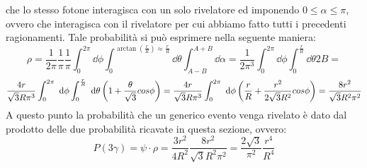   che lo stesso fotone interagisca con un solo rivelatore ed imponendo \(0 \le \alpha \le \pi\), ovvero che interagisca con il rivelatore per cui abbiamo fatto tutti i precedenti
  ragionamenti. Tale probabilità si può esprimere nella seguente maniera:
  $$ \rho = \frac{1}{2\pi}\frac{1}{\pi}\frac{1}{\pi} \int_{0}^{2\pi} \dd\phi \int_{0}^{\arctan\left(\frac{r}{R}\right)\approx \frac{r}{R}} \dd\theta \int_{A-B}^{A+B} \dd\alpha = 
  \frac{1}{2 \pi^3}\int_{0}^{2\pi} \dd\phi \int_{0}^{\frac{r}{R}} \dd\theta 2B =$$
  $$ \frac{4r}{\sqrt{3}R \pi^3}\int_{0}^{2\pi} \mathop{}\,\mathrm{d}\phi \int_{0}^{\frac{r}{R}} \mathop{}\,\mathrm{d}\theta \left( 1 +\frac{\theta}{\sqrt{3}} \\cos \phi \right) =
  \frac{4r}{\sqrt{3} R \pi^3}\int_{0}^{2\pi} \mathop{}\,\mathrm{d}\phi \left( \frac{r}{R} +\frac{r^2}{2\sqrt{3} R^2} \\cos \phi \right) = \frac{8r^2}{\sqrt{3} R^2 \pi^2} $$
  A questo punto la probabilità che un generico evento venga rivelato è dato dal prodotto delle due probabilità ricavate in questa sezione, ovvero:
  $$ P\left( 3 \gamma \right) = \psi \cdot \rho = \frac{3r^2}{4R^2}\frac{8r^2}{\sqrt{3} R^2 \pi^2} = \frac{2 \sqrt{3}}{\pi^2} \frac{r^4}{R^4}  $$
